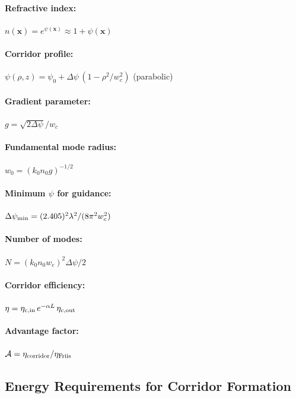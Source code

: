 \documentclass[11pt,a4paper]{article}
\begin{document}
\begin{tcolorbox}[colback=green!5!white, colframe=green!60!black,
title=Core $\psi$-Corridor Equations]

\paragraph{Refractive index:}
$n(\mathbf{x}) = e^{\psi(\mathbf{x})} \approx 1 + \psi(\mathbf{x})$

\paragraph{Corridor profile:}
$\psi(\rho, z) = \psi_0 + \Delta\psi\,(1 - \rho^2/w_c^2)$ (parabolic)

\paragraph{Gradient parameter:}
$g = \sqrt{2\Delta\psi}/w_c$

\paragraph{Fundamental mode radius:}
$w_0 = (k_0 n_0 g)^{-1/2}$

\paragraph{Minimum $\psi$ for guidance:}
$\Delta\psi_{\rm min} = (2.405)^2 \lambda^2/(8\pi^2 w_c^2)$

\paragraph{Number of modes:}
$N = (k_0 n_0 w_c)^2 \Delta\psi / 2$

\paragraph{Corridor efficiency:}
$\eta = \eta_{c,\rm in}\, e^{-\alpha L}\, \eta_{c,\rm out}$

\paragraph{Advantage factor:}
$\mathcal{A} = \eta_{\rm corridor} / \eta_{\rm Friis}$
\end{tcolorbox}

\subsection{Energy Requirements for Corridor Formation}
\end{document}

